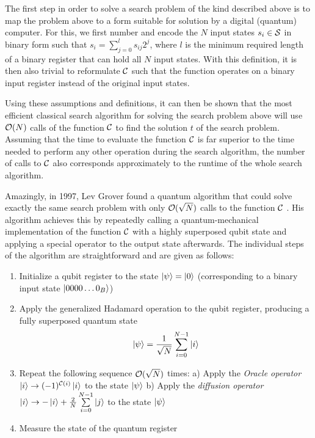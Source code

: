 \smallskip

The first step in order to solve a search problem of the kind described above is to map the problem above to a form suitable for solution by a digital (quantum) computer. For this, we first number and encode the $N$ input states $s_i \in \begin{mathcal}S\end{mathcal}$ in binary form such that $s_i = \sum\limits_{j=0}^l s_{ij}2^j $, where $l$ is the minimum required length of a binary register that can hold all $N$ input states. With this definition, it is then also trivial to reformulate $\Or$ such that the function operates on a binary input register instead of the original input states. 

\smallskip

Using these assumptions and definitions, it can then be shown that the most efficient classical search algorithm for solving the search problem above will use $\begin{mathcal}O\end{mathcal}(N)$ calls of the function $\Or$ to find the solution $t$ of the search problem. Assuming that the time to evaluate the function $\Or$ is far superior to the time needed to perform any other operation during the search algorithm, the number of calls to $\Or$ also corresponds approximately to the runtime of the whole search algorithm.

\smallskip

Amazingly, in 1997, Lev Grover found a quantum algorithm that could solve exactly the same search problem with only $\begin{mathcal}O\end{mathcal}(\sqrt{N})$ calls to the function $\Or$ \citep{Grover_Quantum_1997}. His algorithm achieves this by repeatedly calling a quantum-mechanical implementation of the function $\Or$ with a highly superposed qubit state and applying a special operator to the output state afterwards. The individual steps of the algorithm are straightforward and are given as follows:

\begin{enumerate}
 \item Initialize a qubit register to the state $\left| \psi \right> = \left| 0 \right>$ (corresponding to a binary input state $\left| 0000\hdots0_B \right>$)
 \item Apply the generalized Hadamard operation to the qubit register, producing a fully superposed quantum state $$\left| \psi \right> = \frac{1}{\sqrt{N}}\sum\limits_{i=0}^{N-1} \left| i \right>$$
 \item Repeat the following sequence $\begin{mathcal}O\end{mathcal}(\sqrt{N})$ times:
 \subitem a) Apply the {\it Oracle operator} $\ket{i}\to (-1)^{\Or(i)}\ket{i}$ to the state $\left| \psi \right>$
 \subitem b) Apply the {\it diffusion operator} $\left| i \right> \to -\left| i \right>+\frac{2}{N}\sum\limits_{i=0}^{N-1}\left| j \right>$ to the state $\left| \psi \right>$
	\item Measure the state of the quantum register
\end{enumerate}

